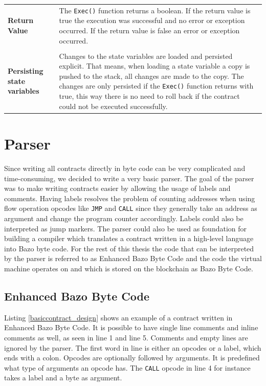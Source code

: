 \begin{tabular}[t]{ p{3cm} p{12.5cm}}
\raggedright
\textbf{Return Value} &
The \texttt{Exec()} function returns a boolean. If the return value is true the execution was successful and no error or exception occurred. If the return value is false an error or exception occurred. \\ \\

\textbf{Persisting state variables} &
Changes to the state variables are loaded and persisted explicit. That means, when loading a state variable a copy is pushed to the stack, all changes are made to the copy. The changes are only persisted if the \texttt{Exec()} function returns with true, this way there is no need to roll back if the contract could not be executed successfully.
\end{tabular}

\section{Parser}
Since writing all contracts directly in byte code can be very complicated and time-consuming, we decided to write a very basic parser. The goal of the parser was to make writing contracts easier by allowing the usage of labels and comments. Having labels resolves the problem of counting addresses when using flow operation opcodes like \texttt{JMP} and \texttt{CALL} since they generally take an address as argument and change the program counter accordingly. Labels could also be interpreted as jump markers. The parser could also be used as foundation for building a compiler which translates a contract written in a high-level language into Bazo byte code. For the rest of this thesis the code that can be interpreted by the parser is referred to as \flqq Enhanced Bazo Byte Code\frqq{} and the code the virtual machine operates on and which is stored on the blockchain as \flqq Bazo Byte Code\frqq.

\subsection{\flqq Enhanced Bazo Byte Code\frqq{}}
Listing \ref{basiccontract_design} shows an example of a contract written in \flqq Enhanced Bazo Byte Code\frqq{}. It is possible to have single line comments and inline comments as well, as seen in line 1 and line 5. Comments and empty lines are ignored by the parser. The first word in line is either an opcodes or a label, which ends with a colon. Opcodes are optionally followed by arguments. It is predefined what type of arguments an opcode has. The \texttt{CALL} opcode in line 4 for instance takes a label and a byte as argument.

